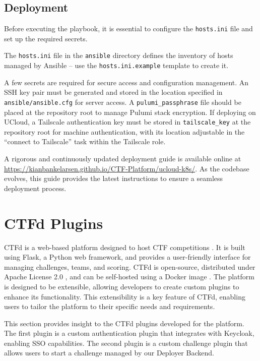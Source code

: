 \subsection{Deployment}

Before executing the playbook, it is essential to configure the \texttt{hosts.ini} file and set up the required secrets.

The \texttt{hosts.ini} file in the \texttt{ansible} directory defines the inventory of hosts managed by Ansible -- use the \texttt{hosts.ini.example} template to create it.

A few secrets are required for secure access and configuration management. An SSH key pair must be generated and stored in the location specified in \texttt{ansible/ansible.cfg} for server access. A \texttt{pulumi\_passphrase} file should be placed at the repository root to manage Pulumi stack encryption. If deploying on UCloud, a Tailscale authentication key must be stored in \texttt{tailscale\_key} at the repository root for machine authentication, with its location adjustable in the ``connect to Tailscale'' task within the Tailscale role.

A rigorous and continuously updated deployment guide is available online at \url{https://kianbankelarsen.github.io/CTF-Platform/ucloud-k8s/}. As the codebase evolves, this guide provides the latest instructions to ensure a seamless deployment process.

\section{CTFd Plugins}
CTFd is a web-based platform designed to host CTF competitions \cite{ctfd_github}. It is built using Flask, a Python web framework, and provides a user-friendly interface for managing challenges, teams, and scoring. CTFd is open-source, distributed under Apache License 2.0 \cite{ctfd_github}, and can be self-hosted using a Docker image \cite{ctfd_docker}. The platform is designed to be extensible, allowing developers to create custom plugins to enhance its functionality. This extensibility is a key feature of CTFd, enabling users to tailor the platform to their specific needs and requirements. 

This section provides insight to the CTFd plugins developed for the platform. The first plugin is a custom authentication plugin that integrates with Keycloak, enabling SSO capabilities. The second plugin is a custom challenge plugin that allows users to start a challenge managed by our Deployer Backend. 

